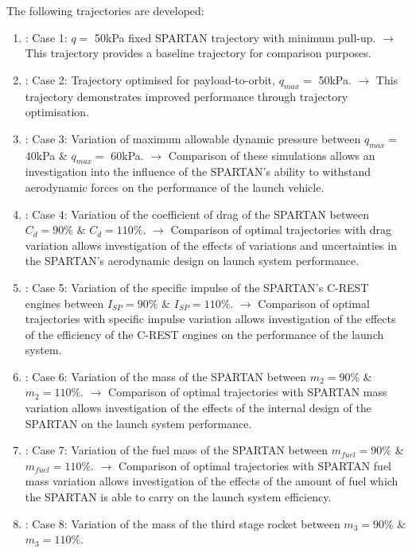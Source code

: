 The following trajectories are developed: 
\begin{enumerate}
	\item: Case 1: $q = $ 50kPa fixed SPARTAN trajectory with minimum pull-up. \newline$\rightarrow$ This trajectory provides a baseline trajectory for comparison purposes.
	\item: Case 2: Trajectory optimised for payload-to-orbit, $q_{max} = $ 50kPa. \newline$\rightarrow$ This trajectory demonstrates improved performance through trajectory optimisation.
	\item: Case 3: Variation of maximum allowable dynamic pressure between $q_{max} = $ 40kPa \& $q_{max} = $ 60kPa. 
	\newline$\rightarrow$ Comparison of these simulations allows an investigation into the influence of the SPARTAN's ability to withstand aerodynamic forces on the performance of the launch vehicle.
	\item: Case 4: Variation of the coefficient of drag of the SPARTAN between $C_d = 90\%$ \& $C_d = 110\%$. 
	\newline$\rightarrow$ Comparison of optimal trajectories with drag variation allows investigation of the effects of variations and uncertainties in the SPARTAN's aerodynamic design on launch system performance.
	\item: Case 5: Variation of the specific impulse of the SPARTAN's C-REST engines between $I_{SP} = 90\%$ \& $I_{SP} = 110\%$. 
	\newline$\rightarrow$ Comparison of optimal trajectories with specific impulse variation allows investigation of the effects of the efficiency of the C-REST engines on the performance of the launch system. 
	\item: Case 6: Variation of the mass of the SPARTAN between $m_2 = 90\%$ \& $m_2 = 110\%$. 
	\newline$\rightarrow$ Comparison of optimal trajectories with SPARTAN mass variation allows investigation of the effects of the internal design of the SPARTAN on the launch system performance. 
	\item: Case 7: Variation of the fuel mass of the SPARTAN between $m_{fuel} = 90\%$ \& $m_{fuel} = 110\%$. 
	\newline$\rightarrow$ Comparison of optimal trajectories with SPARTAN fuel mass variation allows investigation of the effects of the amount of fuel which the SPARTAN is able to carry on the launch system efficiency. 
	\item: Case 8: Variation of the mass of the third stage rocket between $m_3 = 90\%$ \& $m_3 = 110\%$. 

\end{enumerate}
